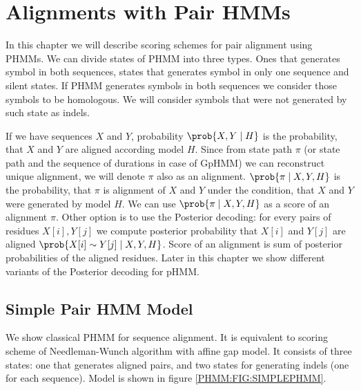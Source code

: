 \chapter{Alignments with Pair HMMs}\label{CHAPTER:PAIRHMM}

In this chapter we will describe scoring schemes for pair alignment using PHMMs.
We can divide states of PHMM into three types.  Ones that generates symbol in
both sequences, states that generates symbol in only one sequence and silent
states. If PHMM generates  symbols in both sequences we consider those symbols
to be homologous. We will consider symbols that were not generated by such state
as indels.

If we have sequences $X$ and $Y$, probability $\prob{X,Y\mid H}$ is the
probability, that $X$ and $Y$ are aligned according model $H$. Since from state
path $\pi$ (or state path and the sequence of durations in case of GpHMM) we can
reconstruct unique alignment, we will denote $\pi$ also as an alignment.
$\prob{\pi\mid X,Y,H}$ is the probability, that $\pi$ is alignment of $X$ and
$Y$ under the condition, that $X$ and $Y$ were generated by model $H$.  We can
use $\prob{\pi\mid X,Y,H}$ as a score of an alignment $\pi$. Other option is to
use the  Posterior decoding: for every pairs of residues $X[i],Y[j]$ we compute
posterior probability that $X[i]$ and $Y[j]$ are aligned $\prob{X[i]\sim Y[j]\mid X,Y,H}$.
Score of an alignment is sum of posterior probabilities of the aligned residues.
Later in this chapter we show different variants of the Posterior decoding for
pHMM.

\section{Simple Pair HMM  Model}\label{SECTION:SIMPLEPHMM}

We show classical PHMM for sequence alignment. It is equivalent to scoring
scheme of Needleman-Wunch algorithm with affine gap model. It consists of three
states: one that generates aligned pairs, and two states for generating
indels (one for each sequence). Model is shown in figure \ref{PHMM:FIG:SIMPLEPHMM}. 


